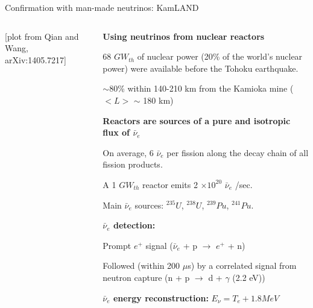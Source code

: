 \begin{frame}[t]{Confirmation with man-made neutrinos: KamLAND}
\begin{columns}
\begin{column}{0.30\textwidth}
    {\scriptsize \color{blue}[plot from Qian and Wang, arXiv:1405.7217]}
  \end{column}
  \begin{column}{0.70\textwidth}
    \begin{itemize}
    {\small
      \item {\bf Using neutrinos from nuclear reactors}
        \begin{itemize}
        {\scriptsize
           \item 68 $GW_{th}$ of nuclear power (20\% of the world's nuclear power) were available before the Tohoku earthquake.
           \item $\sim$80\% within 140-210 km from the Kamioka mine ($<L>$ $\sim$ 180 km)
        }
        \end{itemize}
      \item {\bf Reactors are sources of a pure and isotropic flux of $\bar{\nu}_{e}$}
        \begin{itemize}
        {\scriptsize
            \item On average, 6 $\bar{\nu}_{e}$ per fission along the decay chain of all fission products.
            \item A 1 $GW_{th}$ reactor emits 2 $\times10^{20}$ $\bar{\nu}_{e}$ /sec.
            \item Main $\bar{\nu}_{e}$ sources: $^{235}U$, $^{238}U$, $^{239}Pu$, $^{241}Pu$.
        }
        \end{itemize}
      \item {\bf $\bar{\nu}_{e}$ detection:}
        \begin{itemize}
        {\scriptsize
            \item Prompt $e^{+}$ signal
                  ({\color{red}$\bar{\nu}_{e}$ + p $\rightarrow$ $e^{+}$ + n})
            \item Followed (within 200 $\mu$s) by a correlated signal from neutron capture
                  ({\color{red}n + p $\rightarrow$ d + $\gamma$} (2.2 eV))
        }
        \end{itemize}
      \item {\bf $\bar{\nu}_{e}$ energy reconstruction:} $E_{\nu} = T_{e} + 1.8 MeV$
    }
    \end{itemize}
  \end{column}
\end{columns}
\end{frame}


